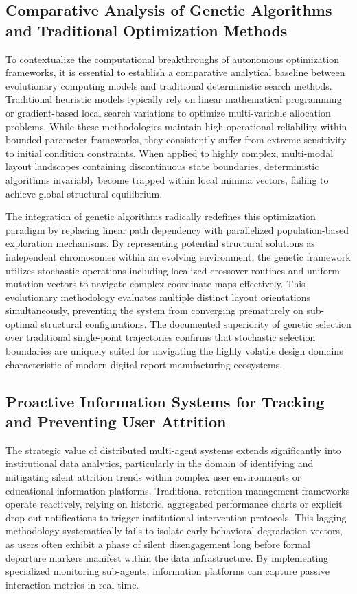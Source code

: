\subsection{Comparative Analysis of Genetic Algorithms and Traditional Optimization Methods}
To contextualize the computational breakthroughs of autonomous optimization frameworks, it is essential to establish a comparative analytical baseline between evolutionary computing models and traditional deterministic search methods. Traditional heuristic models typically rely on linear mathematical programming or gradient-based local search variations to optimize multi-variable allocation problems. While these methodologies maintain high operational reliability within bounded parameter frameworks, they consistently suffer from extreme sensitivity to initial condition constraints. When applied to highly complex, multi-modal layout landscapes containing discontinuous state boundaries, deterministic algorithms invariably become trapped within local minima vectors, failing to achieve global structural equilibrium.

The integration of genetic algorithms radically redefines this optimization paradigm by replacing linear path dependency with parallelized population-based exploration mechanisms. By representing potential structural solutions as independent chromosomes within an evolving environment, the genetic framework utilizes stochastic operations including localized crossover routines and uniform mutation vectors to navigate complex coordinate maps effectively. This evolutionary methodology evaluates multiple distinct layout orientations simultaneously, preventing the system from converging prematurely on sub-optimal structural configurations. The documented superiority of genetic selection over traditional single-point trajectories confirms that stochastic selection boundaries are uniquely suited for navigating the highly volatile design domains characteristic of modern digital report manufacturing ecosystems.

\subsection{Proactive Information Systems for Tracking and Preventing User Attrition}
The strategic value of distributed multi-agent systems extends significantly into institutional data analytics, particularly in the domain of identifying and mitigating silent attrition trends within complex user environments or educational information platforms. Traditional retention management frameworks operate reactively, relying on historic, aggregated performance charts or explicit drop-out notifications to trigger institutional intervention protocols. This lagging methodology systematically fails to isolate early behavioral degradation vectors, as users often exhibit a phase of silent disengagement long before formal departure markers manifest within the data infrastructure. By implementing specialized monitoring sub-agents, information platforms can capture passive interaction metrics in real time.

